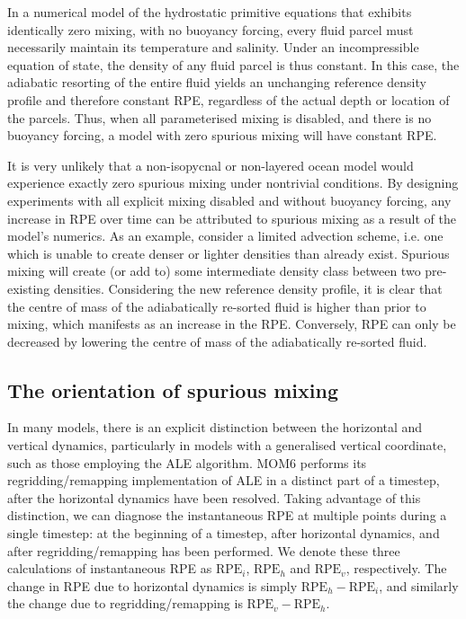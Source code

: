 In a numerical model of the hydrostatic primitive equations that exhibits identically zero mixing, with no buoyancy forcing, every fluid parcel must necessarily maintain its temperature and salinity. Under an incompressible equation of state, the density of any fluid parcel is thus constant. In this case, the adiabatic resorting of the entire fluid yields an unchanging reference density profile and therefore constant RPE, regardless of the actual depth or location of the parcels. Thus, when all parameterised mixing is disabled, and there is no buoyancy forcing, a model with zero spurious mixing will have constant RPE.

It is very unlikely that a non-isopycnal or non-layered ocean model would experience exactly zero spurious mixing under nontrivial conditions. By designing experiments with all explicit mixing disabled and without buoyancy forcing, any increase in RPE over time can be attributed to spurious mixing as a result of the model's numerics. As an example, consider a limited advection scheme, i.e. one which is unable to create denser or lighter densities than already exist. Spurious mixing will create (or add to) some intermediate density class between two pre-existing densities. Considering the new reference density profile, it is clear that the centre of mass of the adiabatically re-sorted fluid is higher than prior to mixing, which manifests as an increase in the RPE. Conversely, RPE can only be decreased by lowering the centre of mass of the adiabatically re-sorted fluid.

\subsection{The orientation of spurious mixing}
In many models, there is an explicit distinction between the horizontal and vertical dynamics, particularly in models with a generalised vertical coordinate, such as those employing the ALE algorithm. MOM6 performs its regridding/remapping implementation of ALE in a distinct part of a timestep, after the horizontal dynamics have been resolved. Taking advantage of this distinction, we can diagnose the instantaneous RPE at multiple points during a single timestep: at the beginning of a timestep, after horizontal dynamics, and after regridding/remapping has been performed. We denote these three calculations of instantaneous RPE as $\text{RPE}_i$, $\text{RPE}_h$ and $\text{RPE}_v$, respectively. The change in RPE due to horizontal dynamics is simply $\text{RPE}_h - \text{RPE}_i$, and similarly the change due to regridding/remapping is $\text{RPE}_v - \text{RPE}_h$.

